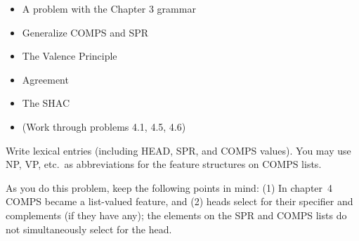 \documentclass[a4paper,landscape,headrule,footrule,dvips]{foils}
\begin{document}
\begin{itemize}
\item A problem with the Chapter 3 grammar
\item Generalize COMPS and SPR
\item The Valence Principle
\item Agreement
\item The SHAC
\item (Work through problems 4.1, 4.5, 4.6)
\end{itemize}
 Write lexical entries (including
HEAD, SPR, and COMPS values). You may use NP, VP, etc.\ as
abbreviations for the feature structures on COMPS lists.

As you do this problem, keep the following points in mind: (1) In 
chapter~4 COMPS became a list-valued feature,
and (2) heads select for their specifier and complements (if they have
any); the elements on the SPR and COMPS lists do not
simultaneously select for the head.

\end{document}
